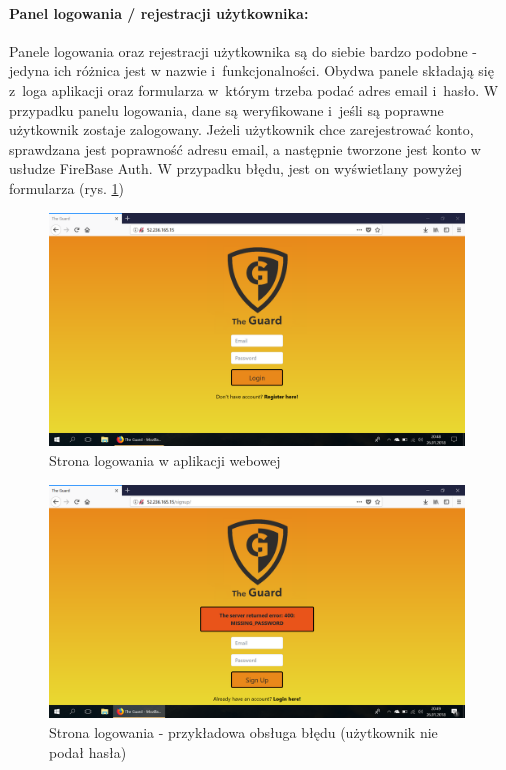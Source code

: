 \paragraph{Panel logowania / rejestracji użytkownika:} Panele logowania oraz rejestracji użytkownika są do siebie bardzo podobne - jedyna ich różnica jest w nazwie i~funkcjonalności. Obydwa panele składają się z~loga aplikacji oraz formularza w~którym trzeba podać adres email i~hasło. W przypadku panelu logowania, dane są weryfikowane i~jeśli są poprawne użytkownik zostaje zalogowany. Jeżeli użytkownik chce zarejestrować konto, sprawdzana jest poprawność adresu email, a następnie tworzone jest konto w usłudze FireBase Auth. W przypadku błędu, jest on wyświetlany powyżej formularza (rys. \ref{web_login})

\begin{figure}[ht]
	\centering
	\includegraphics[width=11cm]{web_screenshots/login.png}
	\caption{Strona logowania w aplikacji webowej}
	\label{web_login}
\end{figure}

\begin{figure}[ht]
	\centering
	\includegraphics[width=11cm]{web_screenshots/error.png}
	\caption{Strona logowania - przykładowa obsługa błędu (użytkownik nie podał hasła)}
	\label{web_login_error}
\end{figure}
